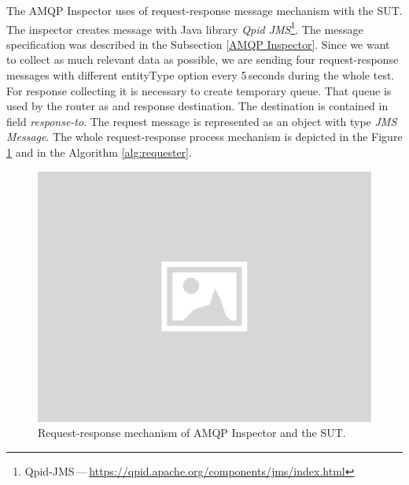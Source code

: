 The AMQP Inspector uses of request-response message mechanism with the SUT. The inspector creates message with Java library \emph{Qpid JMS}\footnote{Qpid-JMS\,---\,\url{https://qpid.apache.org/components/jms/index.html}}. The message specification was described in the Subsection \ref{AMQP Inspector}. Since we want to collect as much relevant data as possible, we are sending four request-response messages with different entityType option every 5\,seconds during the whole test. For response collecting it is necessary to create temporary queue. That queue is used by the router as and response destination. The destination is contained in field \emph{response-to}. The request message is represented as an object with type \emph{JMS Message}. The whole request-response process mechanism is depicted in the Figure \ref{fig:inspector_requests} and in the Algorithm \ref{alg:requester}.

\begin{figure}[H]
  \centering
  \includegraphics[width=13cm]{obrazky-figures/placeholder.png}
  \caption{Request-response mechanism of AMQP Inspector and the SUT.}
  \label{fig:inspector_requests}
\end{figure}
